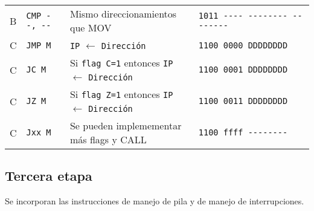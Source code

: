 \documentclass[12pt,twoside]{templates/unerthesis}
\begin{document}
\begin{longtable}[]{@{}llll@{}}
B & \texttt{CMP\ -\/-,\ -\/-} & Mismo direccionamientos que MOV & \texttt{1011\ -\/-\/-\/-\ -\/-\/-\/-\/-\/-\/-\/-\ -\/-\/-\/-\/-\/-\/-\/-}\tabularnewline
C & \texttt{JMP\ M} & \texttt{IP} \(\leftarrow\) \texttt{Dirección} & \texttt{1100\ 0000\ DDDDDDDD}\tabularnewline
C & \texttt{JC\ M} & Si \texttt{flag\ C=1} entonces \texttt{IP} \(\leftarrow\) \texttt{Dirección} & \texttt{1100\ 0001\ DDDDDDDD}\tabularnewline
C & \texttt{JZ\ M} & Si \texttt{flag\ Z=1} entonces \texttt{IP} \(\leftarrow\) \texttt{Dirección} & \texttt{1100\ 0011\ DDDDDDDD}\tabularnewline
C & \texttt{Jxx\ M} & Se pueden implemementar más flags y CALL & \texttt{1100\ ffff\ -\/-\/-\/-\/-\/-\/-\/-}\tabularnewline
\bottomrule
\end{longtable}

\hypertarget{tercera-etapa}{%
\subsection{Tercera etapa}\label{tercera-etapa}}

Se incorporan las instrucciones de manejo de pila y de manejo de interrupciones.
\end{document}
